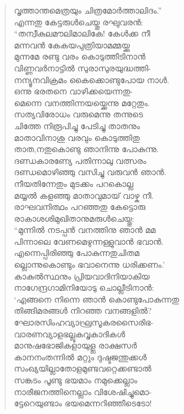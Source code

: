 \begin{verse}
വൃത്താന്തമെത്രയും ചിത്രമോര്‍ത്താലിദം.”\\
എന്നതു കേട്ടരുള്‍ചെയ്തു രഘുവരന്‍:\\
“തന്വീകുലമൗലിമാലികേ! കേള്‍ക്ക നീ\\
മന്നവന്‍ കേകയപുത്രിയാമമ്മയ്ക്കു\\
മുന്നമേ രണ്ടു വരം കൊടുത്തീടിനാന്‍\\
വിണ്ണവര്‍നാട്ടില്‍ സുരാസുരയുദ്ധത്തി-\\
നന്യൂനവിക്രമം കൈക്കൊണ്ടുപോയ നാള്‍.\\
ഒന്നു ഭരതനെ വാഴിക്കയെന്നതു-\\
മെന്നെ വനത്തിന്നയയ്ക്കെന്നു മറ്റേതും.\\
സത്യവിരോധം വരുമെന്നു തന്നുടെ\\
ചിത്തേ നിരൂപിച്ചു പേടിച്ചു താതനും\\
മാതാവിനാശു വരവും കൊടുത്തിതു\\
താത,നതുകൊണ്ടു ഞാനിന്നു പോകുന്നു.\\
ദണ്ഡകാരണ്യേ പതിന്നാലു വത്സരം\\
ദണ്ഡമൊഴിഞ്ഞു വസിച്ചു വരുവന്‍ ഞാന്‍.\\
നീയതിന്നേതും മുടക്കം പറകൊല്ല\\
മയ്യല്‍ കളഞ്ഞു മാതാവുമായ് വാഴ്ക നീ.\\
രാഘവനിത്ഥം പറഞ്ഞതു കേട്ടൊരു\\
രാകാശശിമുഖിതാനുമരുള്‍ചെയ്തു:\\
“മുന്നില്‍ നടപ്പന്‍ വനത്തിനു ഞാന്‍ മമ\\
പിന്നാലെ വേണമെഴുന്നള്ളുവാന്‍ ഭവാന്‍.\\
എന്നെപ്പിരിഞ്ഞു പോകുന്നതുചിതമ\\
ല്ലൊന്നുകൊണ്ടും ഭവാനെന്നു ധരിക്കണം.’\\
കാകുല്‍സ്ഥനും പ്രിയവാദിനിയാകിയ\\
നാഗേന്ദ്രഗാമിനിയോടു ചൊല്ലീടിനാന്‍:\\
‘എങ്ങനെ നിന്നെ ഞാന്‍ കൊണ്ടുപോകുന്നതു\\
തിങ്ങിമരങ്ങള്‍ നിറഞ്ഞ വനങ്ങളില്‍?\\
ഘോരസിംഹവ്യാഘ്രസൂകരസൈരിഭ-\\
വാരണവ്യാളഭല്ലൂകവൃകാദികള്‍\\
മാനുഷഭോജികളായുള്ല രാക്ഷസര്‍\\
കാനനംതന്നില്‍ മറ്റും ദുഷ്ടജന്തുക്കള്‍\\
സംഖ്യയില്ലാതോളമുണ്ടവറ്റെക്കണ്ടാല്‍\\
സങ്കടം പൂണ്ടു ഭയമാം നമുക്കെല്ലാം\\
നാരീജനത്തിനെല്ലാം വിശേഷിച്ചുമൊ-\\
ട്ടേറെയുണ്ടാം ഭയമെന്നറിഞ്ഞീടെടോ!\\

\end{verse}
